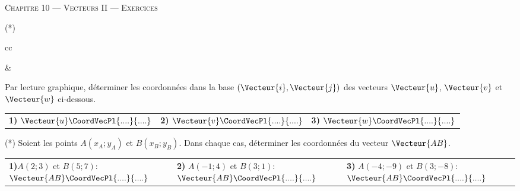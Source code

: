 \documentclass[a4paper]{article}
\begin{document}
\begin{center}
  {\scshape\LARGE Chapitre 10 --- Vecteurs II --- Exercices\par}
\end{center}

\begin{exercice}{(*)}{}

  \begin{tabular}{cc}
    \begin{minipage}{7cm}
      \begin{center}
        \begin{tikzpicture}[scale=0.5,y=1cm,xmin=-4,xmax=7,ymin=-1,ymax=6,
          xgrille=1,xgrilles=1,ygrille=1,ygrilles=1]
          \GrilleTikz %
          \AxesTikz %
          \AxeyTikz[AffGrad=false]{}
    
          \draw[very thick, ->, Red!50!white] (0,0) -- (1,0) node[midway, below] {$\Vecteur{i}$};
          \draw[very thick, ->, Red!50!white] (0,0) -- (0,1) node[midway, left] {$\Vecteur{j}$};
    
    
          \draw[very thick, ->, ForestGreen] (-3,1) -- (-1,5) node[midway, above left] {$\Vecteur{v}$};
          \draw[very thick, ->, Blue] (1,2) -- (6,5) node[midway, above] {$\Vecteur{u}$};
          \draw[very thick, ->, Red] (0,0) -- (5,3) node[midway, above] {$\Vecteur{w}$};
        \end{tikzpicture}
      \end{center}   
    \end{minipage}&
    \begin{minipage}{8cm}
      Par lecture graphique, déterminer les coordonnées dans la base $(\Vecteur{i}, \Vecteur{j})$ des vecteurs $\Vecteur{u}$, $\Vecteur{v}$ et $\Vecteur{w}$ ci-dessous.
\begin{center}

  \begin{tabularx}{.95\linewidth}{X X X }
    \textbf{1)} $\Vecteur{u}\CoordVecPl{....}{....}$ & \textbf{2)} $\Vecteur{v}\CoordVecPl{....}{....}$ & 
    \textbf{3)}  $\Vecteur{w}\CoordVecPl{....}{....}$\\
    \end{tabularx}
\end{center}
    \end{minipage}
  \end{tabular}

\end{exercice}

\begin{exercice}{(*)}{}
  Soient les points $A(x_A;y_A)$ et $B(x_B;y_B)$. Dans chaque cas, déterminer les coordonnées du vecteur $\Vecteur{AB}$.
  \begin{center}
    \begin{tabularx}{.95\linewidth}{X X X }
      \textbf{1)}$A(2;3)$ et $B(5;7)$: $\Vecteur{AB}\CoordVecPl{....}{....}$ & \textbf{2)} $A(-1;4)$ et $B(3;1)$: $\Vecteur{AB}\CoordVecPl{....}{....}$ & 
      \textbf{3)} $A(-4;-9)$ et $B(3;-8)$: $\Vecteur{AB}\CoordVecPl{....}{....}$\\
    \end{tabularx}
  \end{center}
\end{exercice}
\end{document}

